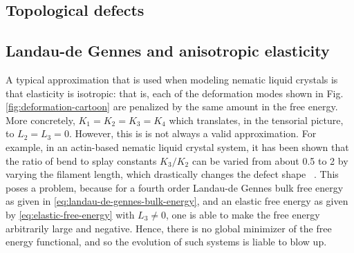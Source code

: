\documentclass[reqno]{article}
\begin{document}
  \subsection{Topological defects}
  

  \subsection{Landau-de Gennes and anisotropic elasticity}
  A typical approximation that is used when modeling nematic liquid crystals is
  that elasticity is isotropic: that is, each of the deformation modes shown in
  Fig. \ref{fig:deformation-cartoon} are penalized by the same amount in the
  free energy.
  More concretely, $K_1 = K_2 = K_3 = K_4$ which translates, in the tensorial
  picture, to $L_2 = L_3 = 0$.
  However, this is is not always a valid approximation.
  For example, in an actin-based nematic liquid crystal system, it has been shown that the
  ratio of bend to splay constants $K_3 / K_2$ can be varied from about 0.5 to 2
  by varying the filament length, which drastically changes the defect shape
  ~\cite{zhang_interplay_2018-1}.
  This poses a problem, because for a fourth order Landau-de Gennes bulk free
  energy as given in \ref{eq:landau-de-gennes-bulk-energy}, and an elastic free
  energy as given by \ref{eq:elastic-free-energy} with $L_3 \neq 0$, one is able
  to make the free energy arbitrarily large and negative.
  Hence, there is no global minimizer of the free energy functional, and so the
  evolution of such systems is liable to blow up.
\end{document}
